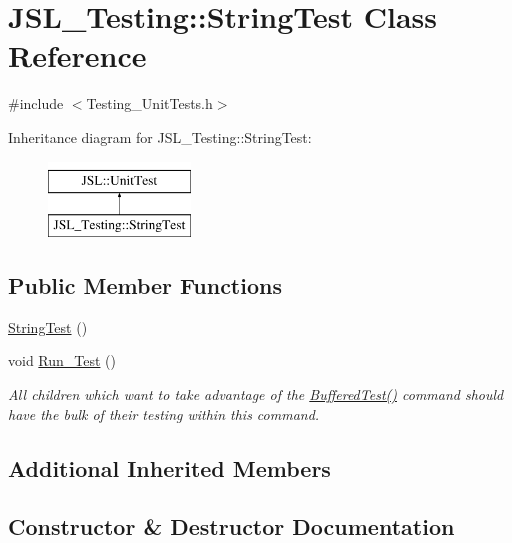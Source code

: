 \hypertarget{classJSL__Testing_1_1StringTest}{}\section{J\+S\+L\+\_\+\+Testing\+:\+:String\+Test Class Reference}
\label{classJSL__Testing_1_1StringTest}


{\ttfamily \#include $<$Testing\+\_\+\+Unit\+Tests.\+h$>$}

Inheritance diagram for J\+S\+L\+\_\+\+Testing\+:\+:String\+Test\+:\begin{figure}[H]
\begin{center}
\leavevmode
\includegraphics[height=2.000000cm]{classJSL__Testing_1_1StringTest}
\end{center}
\end{figure}
\subsection*{Public Member Functions}
\begin{DoxyCompactItemize}
\item 
\hyperlink{classJSL__Testing_1_1StringTest_a5be5ef071697a4e106c1a1e51ded1cf6}{String\+Test} ()
\item 
void \hyperlink{classJSL__Testing_1_1StringTest_ada0409cd10e3f09788994a9115331ff7}{Run\+\_\+\+Test} ()
\begin{DoxyCompactList}\small\item\em All children which want to take advantage of the \hyperlink{classJSL_1_1UnitTest_aabec19b081be8a428f12e4b5e3dc2a9c}{Buffered\+Test()} command should have the bulk of their testing within this command. \end{DoxyCompactList}\end{DoxyCompactItemize}
\subsection*{Additional Inherited Members}


\subsection{Constructor \& Destructor Documentation}
\mbox{\label{classJSL__Testing_1_1StringTest_a5be5ef071697a4e106c1a1e51ded1cf6}} 
